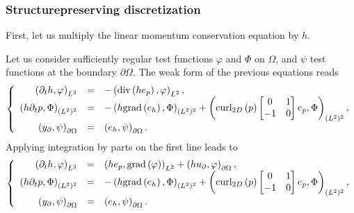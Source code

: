 \documentclass[letterpaper,10pt,english]{sphinxmanual}
\begin{document}
\subsubsection{Structure\sphinxhyphen{}preserving discretization}
\label{\detokenize{examples/shallow_water:structure-preserving-discretization}}
\sphinxAtStartPar
First, let us multiply the linear momentum conservation equation by
\(h\).

\sphinxAtStartPar
Let us consider sufficiently regular test functions \(\varphi\) and
\(\Phi\) on \(\Omega\), and \(\psi\) test functions at the
boundary \(\partial\Omega\). The weak form of the previous equations
reads
\begin{equation*}
\begin{split}\left\lbrace
\begin{array}{rcl}
\left( \partial_t h, \varphi \right)_{L^2} &=& - \left( {\rm div}\left( h e_p \right), \varphi \right)_{L^2}, \\
\left( h \partial_t p, \Phi \right)_{(L^2)^2} &=& - \left( h {\rm grad}\left( e_h \right), \Phi \right)_{(L^2)^2}
                        + \left( {\rm curl}_{2D}\left( p \right) \begin{bmatrix} 0 & 1 \\ -1 & 0 \end{bmatrix} e_p, \Phi \right)_{(L^2)^2}, \\
\left( y_\partial, \psi \right)_{\partial\Omega} &=& \left( e_h, \psi \right)_{\partial\Omega}.
\end{array}
\right.\end{split}
\end{equation*}
\sphinxAtStartPar
Applying integration by parts on the first line leads to
\begin{equation*}
\begin{split}\left\lbrace
\begin{array}{rcl}
\left( \partial_t h, \varphi \right)_{L^2} &=& \left( h e_p, {\rm grad} \left( \varphi \right) \right)_{L^2} + \left( h u_\partial, \varphi \right)_{\partial\Omega}, \\
\left( h \partial_t p, \Phi \right)_{(L^2)^2} &=& - \left( h {\rm grad} \left( e_h \right), \Phi \right)_{(L^2)^2}
                        + \left( {\rm curl}_{2D}\left( p \right) \begin{bmatrix} 0 & 1 \\ -1 & 0 \end{bmatrix} e_p, \Phi \right)_{(L^2)^2}, \\
\left( y_\partial, \psi \right)_{\partial\Omega} &=& \left( e_h, \psi \right)_{\partial\Omega}.
\end{array}
\right.\end{split}
\end{equation*}
\end{document}
